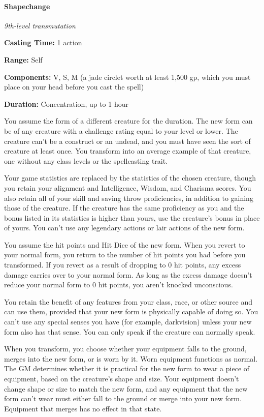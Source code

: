 \documentclass[
]{article}
\begin{document}
\hypertarget{shapechange}{%
\paragraph{Shapechange}\label{shapechange}}

\emph{9th-level transmutation}

\textbf{Casting Time:} 1 action

\textbf{Range:} Self

\textbf{Components:} V, S, M (a jade circlet worth at least 1,500 gp,
which you must place on your head before you cast the spell)

\textbf{Duration:} Concentration, up to 1 hour

You assume the form of a different creature for the duration. The new
form can be of any creature with a challenge rating equal to your level
or lower. The creature can't be a construct or an undead, and you must
have seen the sort of creature at least once. You transform into an
average example of that creature, one without any class levels or the
spellcasting trait.

Your game statistics are replaced by the statistics of the chosen
creature, though you retain your alignment and Intelligence, Wisdom, and
Charisma scores. You also retain all of your skill and saving throw
proficiencies, in addition to gaining those of the creature. If the
creature has the same proficiency as you and the bonus listed in its
statistics is higher than yours, use the creature's bonus in place of
yours. You can't use any legendary actions or lair actions of the new
form.

You assume the hit points and Hit Dice of the new form. When you revert
to your normal form, you return to the number of hit points you had
before you transformed. If you revert as a result of dropping to 0 hit
points, any excess damage carries over to your normal form. As long as
the excess damage doesn't reduce your normal form to 0 hit points, you
aren't knocked unconscious.

You retain the benefit of any features from your class, race, or other
source and can use them, provided that your new form is physically
capable of doing so. You can't use any special senses you have (for
example, darkvision) unless your new form also has that sense. You can
only speak if the creature can normally speak.

When you transform, you choose whether your equipment falls to the
ground, merges into the new form, or is worn by it. Worn equipment
functions as normal. The GM determines whether it is practical for the
new form to wear a piece of equipment, based on the creature's shape and
size. Your equipment doesn't change shape or size to match the new form,
and any equipment that the new form can't wear must either fall to the
ground or merge into your new form. Equipment that merges has no effect
in that state.
\end{document}
